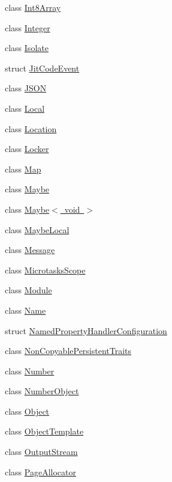 \begin{DoxyCompactItemize}
class \mbox{\hyperlink{classv8_1_1Int8Array}{Int8\+Array}}
\item 
class \mbox{\hyperlink{classv8_1_1Integer}{Integer}}
\item 
class \mbox{\hyperlink{classv8_1_1Isolate}{Isolate}}
\item 
struct \mbox{\hyperlink{structv8_1_1JitCodeEvent}{Jit\+Code\+Event}}
\item 
class \mbox{\hyperlink{classv8_1_1JSON}{J\+S\+ON}}
\item 
class \mbox{\hyperlink{classv8_1_1Local}{Local}}
\item 
class \mbox{\hyperlink{classv8_1_1Location}{Location}}
\item 
class \mbox{\hyperlink{classv8_1_1Locker}{Locker}}
\item 
class \mbox{\hyperlink{classv8_1_1Map}{Map}}
\item 
class \mbox{\hyperlink{classv8_1_1Maybe}{Maybe}}
\item 
class \mbox{\hyperlink{classv8_1_1Maybe_3_01void_01_4}{Maybe$<$ void $>$}}
\item 
class \mbox{\hyperlink{classv8_1_1MaybeLocal}{Maybe\+Local}}
\item 
class \mbox{\hyperlink{classv8_1_1Message}{Message}}
\item 
class \mbox{\hyperlink{classv8_1_1MicrotasksScope}{Microtasks\+Scope}}
\item 
class \mbox{\hyperlink{classv8_1_1Module}{Module}}
\item 
class \mbox{\hyperlink{classv8_1_1Name}{Name}}
\item 
struct \mbox{\hyperlink{structv8_1_1NamedPropertyHandlerConfiguration}{Named\+Property\+Handler\+Configuration}}
\item 
class \mbox{\hyperlink{classv8_1_1NonCopyablePersistentTraits}{Non\+Copyable\+Persistent\+Traits}}
\item 
class \mbox{\hyperlink{classv8_1_1Number}{Number}}
\item 
class \mbox{\hyperlink{classv8_1_1NumberObject}{Number\+Object}}
\item 
class \mbox{\hyperlink{classv8_1_1Object}{Object}}
\item 
class \mbox{\hyperlink{classv8_1_1ObjectTemplate}{Object\+Template}}
\item 
class \mbox{\hyperlink{classv8_1_1OutputStream}{Output\+Stream}}
\item 
class \mbox{\hyperlink{classv8_1_1PageAllocator}{Page\+Allocator}}
\item 

\end{DoxyCompactItemize}
